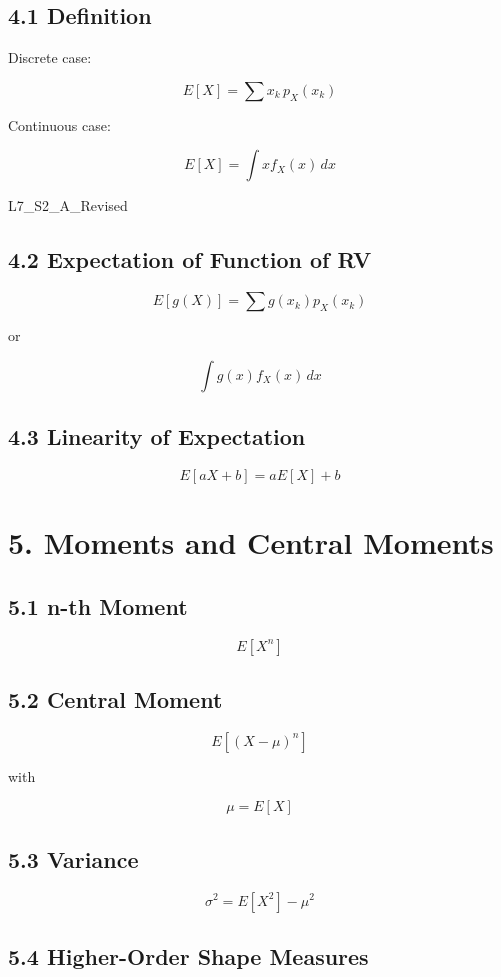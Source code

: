 \documentclass[11pt]{article}
\begin{document}
\subsection*{4.1 Definition}

Discrete case:

\[
E[X]=\sum x_k\, p_X(x_k)
\]

Continuous case:

\[
E[X]=\int x f_X(x)\,dx
\]

L7\_S2\_A\_Revised

\subsection*{4.2 Expectation of Function of RV}

\[
E[g(X)]=\sum g(x_k)p_X(x_k)
\]

or

\[
\int g(x)f_X(x)\,dx
\]

\subsection*{4.3 Linearity of Expectation}

\[
E[aX+b]=aE[X]+b
\]

\section*{5. Moments and Central Moments}

\subsection*{5.1 n-th Moment}

\[
E[X^n]
\]

\subsection*{5.2 Central Moment}

\[
E[(X-\mu)^n]
\]

with

\[
\mu=E[X]
\]

\subsection*{5.3 Variance}

\[
\sigma^2 = E[X^2]-\mu^2
\]

\subsection*{5.4 Higher-Order Shape Measures}
\end{document}
